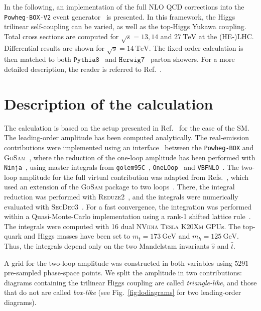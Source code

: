 \documentclass[a4paper]{jpconf}
\newcommand{\GeV}{\ensuremath{\mathrm{\:GeV}}}
\newcommand{\TeV}{\ensuremath{\mathrm{\:TeV}}}
\newcommand{\pythia}{\texttt{Pythia8}}
\newcommand{\herwig}{\texttt{Herwig7}}
\begin{document}
In the following, an implementation of the full NLO QCD corrections into the \texttt{Powheg-BOX-V2} event generator~\cite{Nason:2004rx,Frixione:2007vw,Alioli:2010xd} is presented. In this framework, the Higgs trilinear self-coupling can be varied, as well as the top-Higgs Yukawa coupling. Total cross sections are computed for $\sqrt{s}=13,14$ and $27 \TeV$ at the (HE-)LHC. Differential results are shown for $\sqrt{s}=14 \TeV$. The fixed-order calculation is then matched to both $\pythia$~\cite{Sjostrand:2014zea} and $\herwig$~\cite{Bellm:2017bvx} parton showers. For a more detailed description, the reader is referred to Ref.~\cite{Heinrich:2019bkc}.

\section{Description of the calculation}

The calculation is based on the setup presented in Ref.~\cite{Heinrich:2017kxx} for the case of the SM. The leading-order amplitude has been computed analytically. The real-emission contributions were implemented using an interface~\cite{Luisoni:2013kna} between the \texttt{Powheg-BOX} and \textsc{GoSam}~\cite{Cullen:2011ac,Cullen:2014yla}, 
where the reduction of the one-loop amplitude has been performed with \texttt{Ninja}~\cite{Peraro:2014cba}, using master integrals from 
\texttt{golem95C}~\cite{Binoth:2008uq,Cullen:2011kv}, \texttt{OneLOop}~\cite{vanHameren:2010cp} and \texttt{VBFNLO}~\cite{Arnold:2008rz,Baglio:2014uba}.
The two-loop amplitude for the full virtual contribution was adapted from Refs.~\cite{Borowka:2016ehy,Borowka:2016ypz}, which used an extension of the \textsc{GoSam} package to two loops~\cite{Jones:2016bci}. There, the integral reduction was performed with \textsc{Reduze2}~\cite{vonManteuffel:2012np}, and the integrals were numerically evaluated with \textsc{SecDec3}~\cite{Borowka:2015mxa}. For a fast convergence, the integration was performed within a Quasi-Monte-Carlo implementation using a rank-1 shifted lattice rule~\cite{Borowka:2018goh,Jones:theseproceedings}. The integrals were computed with 16 dual \textsc{NVidia Tesla K20Xm} GPUs. The top-quark and Higgs masses have been set to $m_t=173 \GeV$ and $m_h = 125 \GeV$. Thus, the integrals depend only on the two Mandelstam invariants $\hat{s}$ and $\hat{t}$.

A grid for the two-loop amplitude was constructed in both variables using $5291$ pre-sampled phase-space points. %
We split the amplitude in two contributions: diagrams containing the trilinear Higgs coupling are called \textit{triangle-like}, and those that do not are called \textit{box-like} (see Fig.~\ref{fig:lodiagrams} for two leading-order diagrams). 
\end{document}
